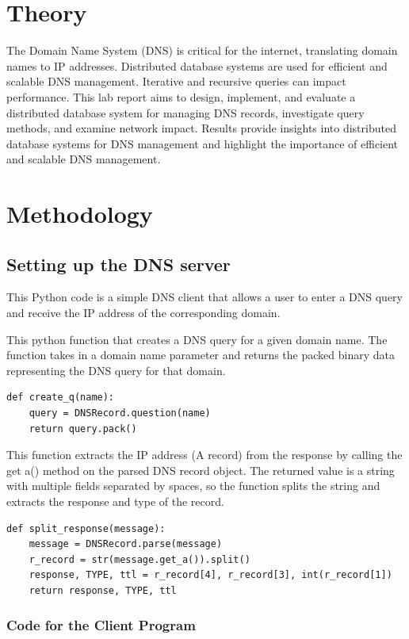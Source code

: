 \documentclass[11pt]{article}
\begin{document}
\section{Theory}
The Domain Name System (DNS) is critical for the internet, translating domain names to IP addresses. Distributed database systems are used for efficient and scalable DNS management. Iterative and recursive queries can impact performance. This lab report aims to design, implement, and evaluate a distributed database system for managing DNS records, investigate query methods,
and examine network impact. Results provide insights into distributed database systems for DNS management and highlight the importance of efficient and scalable DNS management.

\section{Methodology}

\subsection{Setting up the DNS server}

This Python code is a simple DNS client that allows a user to enter a DNS query and receive the IP address of the corresponding domain.

This python function that creates a DNS query for a given domain name. The function takes in a domain name parameter and returns the packed binary data representing the DNS query for that domain.

\begin{verbatim}
def create_q(name):
    query = DNSRecord.question(name)
    return query.pack()
\end{verbatim}

This function extracts the IP address (A record) from the response by calling the get a() method on the parsed DNS record object. The returned value is a string with multiple fields separated by spaces, so the function splits the string and extracts the response and type of the record.

\begin{verbatim}
def split_response(message):
    message = DNSRecord.parse(message)
    r_record = str(message.get_a()).split()
    response, TYPE, ttl = r_record[4], r_record[3], int(r_record[1])
    return response, TYPE, ttl
\end{verbatim}

\subsubsection{Code for the Client Program}
\end{document}
